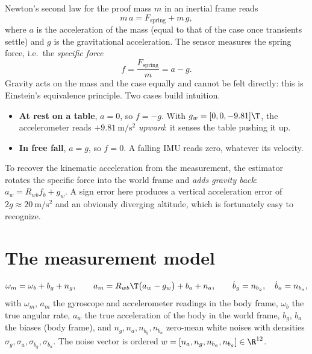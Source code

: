 Newton's second law for the proof mass $m$ in an inertial frame reads
\begin{equation}
  m\,a = F_{\text{spring}} + m\,g,
\end{equation}
where $a$ is the acceleration of the mass (equal to that of the case once transients settle) and $g$ is the
gravitational acceleration. The sensor measures the spring force, i.e.\ the \emph{specific force}
\begin{equation}
  f = \frac{F_{\text{spring}}}{m} = a - g .
\end{equation}
Gravity acts on the mass and the case equally and cannot be felt directly: this is Einstein's equivalence
principle. Two cases build intuition.
\begin{itemize}
  \item \textbf{At rest on a table}, $a = 0$, so $f = -g$. With $g_w = [0, 0, -9.81]\T$, the accelerometer reads
        $+9.81~\mathrm{m/s^2}$ \emph{upward}: it senses the table pushing it up.
  \item \textbf{In free fall}, $a = g$, so $f = 0$. A falling IMU reads zero, whatever its velocity.
\end{itemize}
To recover the kinematic acceleration from the measurement, the estimator rotates the specific force into
the world frame and \emph{adds gravity back}: $a_w = R_{wb}f_b + g_w$. A sign error here produces a vertical
acceleration error of $2g \approx 20~\mathrm{m/s^2}$ and an obviously diverging altitude, which is
fortunately easy to recognize.

\section{The measurement model}

\begin{convention}
\begin{equation}
  \omega_m = \omega_b + b_g + n_g, \qquad
  a_m = R_{wb}\T\big(a_w - g_w\big) + b_a + n_a, \qquad
  \dot b_g = n_{b_g}, \quad \dot b_a = n_{b_a},
  \label{eq:imu-model}
\end{equation}
with $\omega_m$, $a_m$ the gyroscope and accelerometer readings in the body frame, $\omega_b$ the true angular rate,
$a_w$ the true acceleration of the body in the world frame, $b_g$, $b_a$ the biases (body frame), and
$n_g, n_a, n_{b_g}, n_{b_a}$ zero-mean white noises with densities $\sigma_g, \sigma_a, \sigma_{b_g}, \sigma_{b_a}$. The noise
vector is ordered $w = [n_a, n_g, n_{b_a}, n_{b_g}] \in \R^{12}$.
\end{convention}

